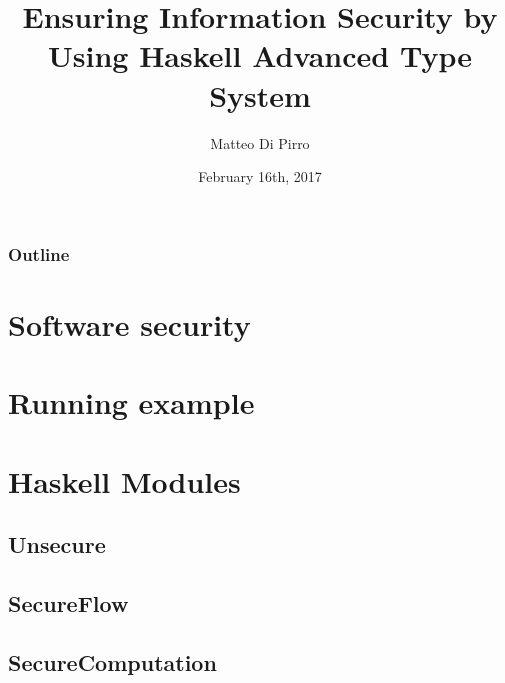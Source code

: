 \documentclass{beamer}
\title{Ensuring Information Security \newline by Using Haskell Advanced Type System}
\subtitle{}
\author{Matteo Di Pirro}
\date{February 16th, 2017}
\institute{University of Padova}
\begin{document}
\newcommand{\turnOffNumbers}{true} %

\begin{frame}[noframenumbering]
\titlepage
\end{frame}

\let\turnOffNumbers\empty
\begin{frame}
	\frametitle{Outline}
	\tableofcontents
\end{frame}

\section{Software security}



\section{Running example}


\section{Haskell Modules}
	\subsection{Unsecure}
	
	\subsection{SecureFlow}
	
	\subsection{SecureComputation}
	
	
\appendix
\makethanks
\renewcommand{\turnOffNumbers}{true} %
\end{document}
